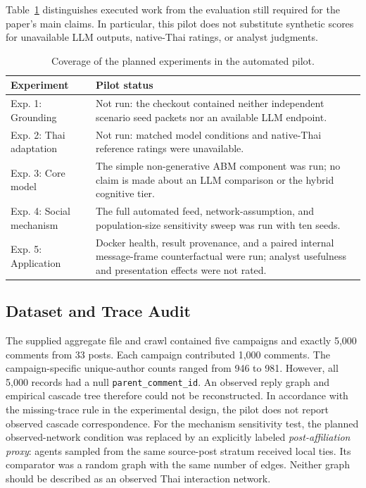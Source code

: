 \documentclass[conference]{IEEEtran}
\begin{document}
Table~\ref{tab:pilot-coverage} distinguishes executed work from the evaluation
still required for the paper's main claims. In particular, this pilot does not
substitute synthetic scores for unavailable LLM outputs, native-Thai ratings,
or analyst judgments.

\begin{table}[t]
\caption{Coverage of the planned experiments in the automated pilot.}
\label{tab:pilot-coverage}
\centering
\footnotesize
\begin{tabular}{@{}p{}p{}@{}}
\toprule
Experiment & Pilot status \\
\midrule
Exp. 1: Grounding & Not run: the checkout contained neither independent
scenario seed packets nor an available LLM endpoint. \\
Exp. 2: Thai adaptation & Not run: matched model conditions and native-Thai
reference ratings were unavailable. \\
Exp. 3: Core model & The simple non-generative ABM component was run; no claim
is made about an LLM comparison or the hybrid cognitive tier. \\
Exp. 4: Social mechanism & The full automated feed, network-assumption, and
population-size sensitivity sweep was run with ten seeds. \\
Exp. 5: Application & Docker health, result provenance, and a paired internal
message-frame counterfactual were run; analyst usefulness and presentation
effects were not rated. \\
\bottomrule
\end{tabular}
\end{table}

\subsection{Dataset and Trace Audit}

The supplied aggregate file and crawl contained five campaigns and exactly
5,000 comments from 33 posts. Each campaign contributed 1,000 comments. The
campaign-specific unique-author counts ranged from 946 to 981. However, all
5,000 records had a null \texttt{parent\_comment\_id}. An observed reply graph
and empirical cascade tree therefore could not be reconstructed. In accordance
with the missing-trace rule in the experimental design, the pilot does not
report observed cascade correspondence. For the mechanism sensitivity test,
the planned observed-network condition was replaced by an explicitly labeled
\emph{post-affiliation proxy}: agents sampled from the same source-post stratum
received local ties. Its comparator was a random graph with the same number of
edges. Neither graph should be described as an observed Thai interaction
network.
\end{document}
